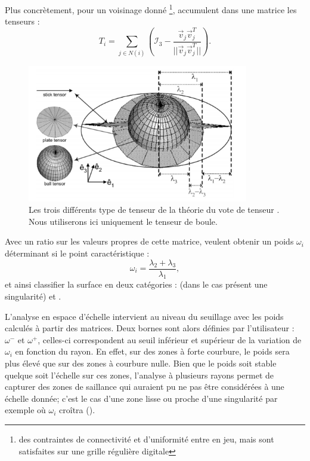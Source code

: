 Plus concrètement, pour un voisinage donné \footnote{des contraintes de
connectivité et d'uniformité entre en jeu, mais sont satisfaites sur une grille
régulière digitale},  accumulent dans une matrice les
tenseurs :
%
\begin{equation}
  T_i = \sum\limits_{j \in N(i)} \left(\mathcal{I}_3 - \frac{\overrightarrow{v}_j\overrightarrow{v}_j^T}{||\overrightarrow{v}_j\overrightarrow{v}_j^T||} \right) .
\end{equation}

\begin{figure}[ht]{
    \begin{center}
    \includegraphics[height=6cm]{images/Feature/Tensor_voting_notations}
    \end{center}}
    \caption{Les trois différents type de tenseur de la théorie du vote de tenseur \cite{Medioni2000-2}. Nous utiliserons ici uniquement le tenseur de boule.
      \label{fig:TV-multiscale}}
\end{figure}

Avec un ratio sur les valeurs propres de cette matrice,  veulent
obtenir un poids $\omega_i$ déterminant si le point caractéristique :
%
\begin{equation}
  \omega_i = \frac{\lambda_2 + \lambda_3}{\lambda_1},
\end{equation}
%
et ainsi classifier la surface en deux catégories : \Feature (\cad dans le cas
présent une singularité) et \NonFeature.


L'analyse en espace d'échelle intervient au niveau du seuillage avec les poids
calculés à partir des matrices. Deux bornes sont alors définies par
l'utilisateur : $\omega^-$ et $\omega^+$, celles-ci correspondent au seuil
inférieur et supérieur de la variation de $\omega_i$ en fonction du rayon. En
effet, sur des zones à forte courbure, le poids sera plus élevé que sur des
zones à courbure nulle. Bien que le poids soit stable quelque soit l'échelle sur
ces zones, l'analyse à plusieurs rayons permet de capturer des zones de
saillance qui auraient pu ne pas être considérées à une échelle donnée; c'est le
cas d'une zone lisse ou proche d'une singularité par exemple où $\omega_i$ croîtra
().

